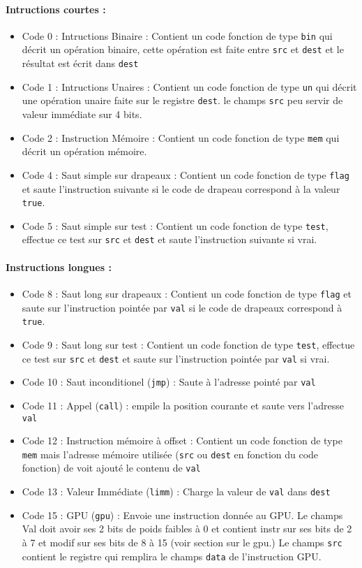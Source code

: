 \documentclass[12pt]{article}
\begin{document}
\paragraph{Intructions courtes :}
\begin{itemize}
\item Code 0 : Intructions Binaire : Contient un code fonction de type
  \verb!bin! qui décrit un opération binaire, cette opération est faite entre
  \verb!src! et \verb!dest! et le résultat est écrit dans \verb!dest!
\item Code 1 : Intructions Unaires : Contient un code fonction de type \verb!un!
  qui décrit une opération unaire faite sur le registre \verb!dest!. le champs \verb!src!
  peu servir de valeur immédiate sur 4 bits.
\item Code 2 : Instruction Mémoire : Contient un code fonction de type
  \verb!mem! qui décrit un opération mémoire.
\item Code 4 : Saut simple sur drapeaux  : Contient un code fonction de type \verb!flag!
  et saute l'instruction suivante si le code de drapeau correspond à la valeur
  \verb!true!.
\item Code 5 : Saut simple sur test : Contient un code fonction de type
  \verb!test!, effectue ce test sur \verb!src! et \verb!dest! et saute
  l'instruction suivante si vrai.
\end{itemize}

\paragraph{Instructions longues :}
\begin{itemize}
\item Code 8 : Saut long sur drapeaux : Contient un code fonction de type \verb!flag!
  et saute sur l'instruction pointée par \verb!val! si le code de drapeaux
  correspond à \verb!true!.
\item Code 9 : Saut long sur test : Contient un code fonction de type
  \verb!test!, effectue ce test sur \verb!src! et \verb!dest! et saute
  sur l'instruction pointée par \verb!val! si vrai.
\item Code 10 : Saut inconditionel (\verb!jmp!) : Saute à l'adresse pointé par \verb!val!
\item Code 11 : Appel (\verb!call!) : empile la position courante et saute vers l'adresse
  \verb!val!
\item Code 12 : Instruction mémoire à offset : Contient un code fonction de type
  \verb!mem! mais l'adresse mémoire utilisée (\verb!src! ou \verb!dest! en
  fonction du code fonction) de voit ajouté le contenu de \verb!val!
\item Code 13 : Valeur Immédiate (\verb!limm!) : Charge la valeur de \verb!val! dans \verb!dest! 
\item Code 15 : GPU (\verb!gpu!) : Envoie une instruction donnée au GPU. Le
  champs Val doit avoir ses 2 bits de poids faibles à 0 et contient instr sur
  ses bits de 2 à 7 et modif sur ses bits de 8 à 15 (voir section sur le gpu.)
  Le champs \verb!src! contient le registre qui remplira le champs \verb!data!
  de l'instruction GPU.
\end{itemize}
\end{document}

